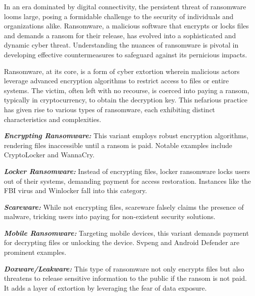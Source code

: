 \documentclass[12pt,twocolumn]{article}
\begin{document}
    In an era dominated by digital connectivity, the persistent threat of ransomware looms large, posing a formidable challenge to the security of individuals and organizations alike. Ransomware, a malicious software that encrypts or locks files and demands a ransom for their release, has evolved into a sophisticated and dynamic cyber threat. Understanding the nuances of ransomware is pivotal in developing effective countermeasures to safeguard against its pernicious impacts.

    Ransomware, at its core, is a form of cyber extortion wherein malicious actors leverage advanced encryption algorithms to restrict access to files or entire systems. The victim, often left with no recourse, is coerced into paying a ransom, typically in cryptocurrency, to obtain the decryption key. This nefarious practice has given rise to various types of ransomware, each exhibiting distinct characteristics and complexities.
    
    \textbf{\textit{Encrypting Ransomware:}} This variant employs robust encryption algorithms, rendering files inaccessible until a ransom is paid. Notable examples include CryptoLocker and WannaCry.

    \textbf{\textit{Locker Ransomware:}} Instead of encrypting files, locker ransomware locks users out of their systems, demanding payment for access restoration. Instances like the FBI virus and Winlocker fall into this category.

    \textbf{\textit{Scareware:}} While not encrypting files, scareware falsely claims the presence of malware, tricking users into paying for non-existent security solutions.

    \textbf{\textit{Mobile Ransomware:}} Targeting mobile devices, this variant demands payment for decrypting files or unlocking the device. Svpeng and Android Defender are prominent examples.
    
    \textbf{\textit{Doxware/Leakware:}} This type of ransomware not only encrypts files but also threatens to release sensitive information to the public if the ransom is not paid. It adds a layer of extortion by leveraging the fear of data exposure.
    
\end{document}
